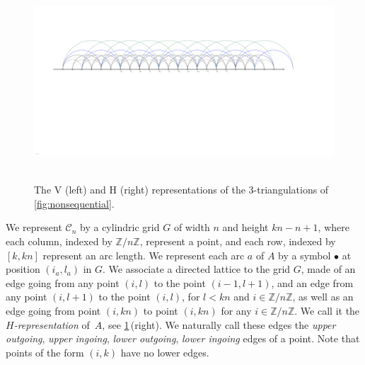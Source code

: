 \documentclass{amsart}
\theoremstyle{remark}
\newcommand{\darkblue}{\color{darkblue}} %
\newcommand{\defn}[1]{\textsl{\darkblue #1}} %
\newcommand{\Z}{\mathbb{Z}} %
\newcommand{\cylinder}{\mathcal{C}}
\begin{document}
\begin{figure}[b]
	\mbox{\includegraphics[page=7, scale=.5, clip, trim=21.2cm 0cm 24cm 6cm]{FNSk3p2} \quad {}}
	\caption{The V (left) and H (right) representations of the $3$-triangulations of \cref{fig:nonsequential}.}
	\label{fig:nonsequentialVHrep}
\end{figure}

We represent $\cylinder_n$ by a cylindric grid $G$ of width $n$ and height $kn-n+1$, where each column, indexed by $\Z/n\Z$, represent a point, and each row, indexed by $[k,kn]$ represent an arc length.
We represent each arc $a$ of $A$ by a symbol $\bullet$ at position $(i_a,l_a)$ in $G$.
We associate a directed lattice to the grid $G$, made of an edge going from any point $(i,l)$ to the point $(i-1,l+1)$, and an edge from any point $(i,l+1)$ to the point $(i,l)$, for $l<kn$ and $i \in \Z/n\Z$, as well as an edge going from point $(i,kn)$ to point $(i,kn)$ for any $i \in \Z/n\Z$.
We call it the \defn{$H$-representation} of~$A$, see \cref{fig:nonsequentialVHrep}\,(right).
We naturally call these edges the \emph{upper outgoing}, \emph{upper ingoing}, \emph{lower outgoing}, \emph{lower ingoing} edges of a point. Note that points of the form $(i,k)$ have no lower edges.
\end{document}
